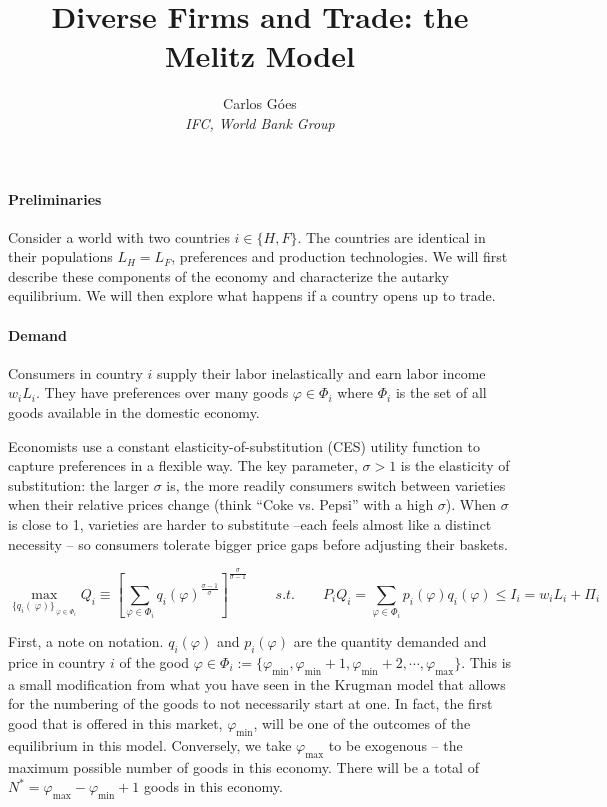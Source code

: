 \documentclass[11pt,letterpaper]{article}
\begin{document}
\title{\textbf{Diverse Firms and Trade: the Melitz Model}}
\author{\large%
\setcounter{footnote}{0}%
Carlos G\'{o}es \\[-3pt] \textit{\small IFC, World Bank Group}
}
\maketitle

\paragraph{Preliminaries} Consider a world with two countries $i \in \{H,F \}$. The countries are identical in their populations $L_H=L_F$, preferences and production technologies. We will first describe these components of the economy and characterize the autarky equilibrium. We will then explore what happens if a country opens up to trade. 

\paragraph{Demand} Consumers in country $i$ supply their labor inelastically and earn labor income $w_i L_i$. They have preferences over many goods $\varphi \in \Phi_i$ where $\Phi_i$ is the set of all goods available in the domestic economy.

Economists use a constant elasticity-of-substitution (CES) utility function to capture preferences in a flexible way. The key parameter,  $\sigma > 1$ is the elasticity of substitution: the larger $\sigma$ is, the more readily consumers switch between varieties when their relative prices change (think “Coke vs. Pepsi” with a high $\sigma$). When $\sigma$ is close to 1, varieties are harder to substitute --each feels almost like a distinct necessity -- so consumers tolerate bigger price gaps before adjusting their baskets.

\begin{equation*}
    \max_{\{q_i(\
\varphi)\}_{\
\varphi \in \Phi_i}} Q_i \equiv \left[ \sum_{\varphi \in \Phi_i } q_i(
\varphi)^{\tfrac{\sigma-1}{\sigma}} \right]^{\tfrac{\sigma}{\sigma-1} } \qquad s.t. \qquad  P_i Q_i =\sum_{\varphi \in \Phi_i } p_i(\varphi) q_i(\varphi) \le I_i = w_i L_i + \Pi_i
\end{equation*}

First, a note on notation. $q_i(\varphi)$ and $p_i(\varphi)$ are the quantity demanded and price in country $i$ of the good $\varphi \in \Phi_i:=\{\varphi_{\min}, \varphi_{\min}+1, \varphi_{\min}+2, \cdots, \varphi_{\max}\}$. This is a small modification from what you have seen in the Krugman model that allows for the numbering of the goods to not necessarily start at one. In fact, the first good that is offered in this market, $\varphi_{\min}$, will be one of the outcomes of the equilibrium in this model. Conversely, we take $\varphi_{\max}$ to be exogenous -- the maximum possible number of goods in this economy. There will be a total of $N^*=\varphi_{\max}-\varphi_{\min}+1$ goods in this economy. 
\end{document}
